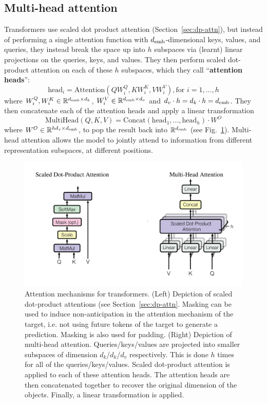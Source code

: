 \documentclass[11pt]{article}
\numberwithin{equation}{section}
\begin{document}
\subsection{Multi-head attention} \label{sec:multi_head_attn}
Transformers use scaled dot product attention (Section~\ref{sec:dp-attn}), but instead of performing a single attention function with $d_{\text{emb}}$-dimensional keys, values, and queries, they instead break the space up into $h$ subspaces via (learnt) linear projections on the queries, keys, and values. They then perform scaled dot-product attention on each of these $h$ subspaces, which they call ``\textbf{attention heads}'':
\begin{equation}
\text{head}_i = \text{Attention}(QW_i^Q, KW_i^K, VW_i^V), \text{for } i = 1,...,h
\end{equation}
where $W_i^Q, W_i^K \in \mathbb{R}^{d_{\text{emb}} \times d_k}$, $W_i^V \in \mathbb{R}^{d_{\text{emb}} \times d_v}$ and $d_v \cdot h = d_k \cdot h = d_{\text{emb}}$. They then concatenate each of the attention heads and apply a linear transformation
\begin{equation}
\text{MultiHead}(Q, K, V) = \text{Concat}(\text{head}_1, ..., \text{head}_h) \cdot W^O
\end{equation}
where $W^O \in \mathbb{R}^{h d_v \times d_{\text{emb}}}$, to pop the result back into $\mathbb{R}^{d_{\text{emb}}}$ (see Fig.~\ref{fig:multi_head_attn}). Multi-head attention allows the model to jointly attend to information from different representation subspaces, at different positions. 

\begin{figure}
\begin{center}
\includegraphics[width=0.7\columnwidth]{../figures/multi-head-attn.jpg}  
\end{center}
\caption{Attention mechanisms for transformers. (Left) Depiction of scaled dot-product attentions (see Section~\ref{sec:dp-attn}. Masking can be used to induce non-anticipation in the attention mechanism of the target, i.e. not using future tokens of the target to generate a prediction. Masking is also used for padding. (Right) Depiction of multi-head attention. Queries/keys/values are projected into smaller subspaces of dimension $d_k$/$d_k$/$d_v$ respectively. This is done $h$ times for all of the queries/keys/values. Scaled dot-product attention is applied to each of these attention heads. The attention heads are then concatenated together to recover the original dimension of the objects. Finally, a linear transformation is applied.}
\label{fig:multi_head_attn}
\end{figure}
\end{document}
